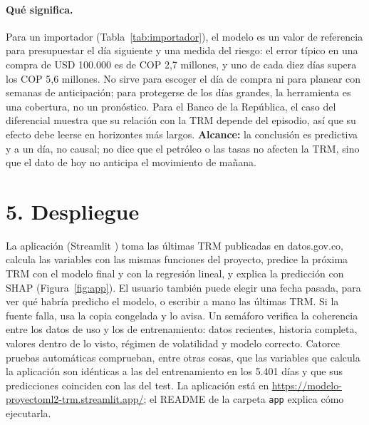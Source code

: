 \documentclass[11pt,letterpaper]{article}
\newcommand{\enlaceapp}{\url{https://modelo-proyectoml2-trm.streamlit.app/}}
\begin{document}
\begin{table}[!htbp]
\centering\footnotesize
\setlength{\tabcolsep}{4pt}
\caption{Error en el test para un importador que compra USD 100.000 (2022--2026).}
\label{tab:importador}

\end{table}

\paragraph{Qué significa.} Para un importador (Tabla~\ref{tab:importador}), el modelo es un valor de referencia para presupuestar el día siguiente y una medida del riesgo: el error típico en una compra de USD 100.000 es de COP 2,7 millones, y uno de cada diez días supera los COP 5,6 millones. No sirve para escoger el día de compra ni para planear con semanas de anticipación; para protegerse de los días grandes, la herramienta es una cobertura, no un pronóstico. Para el Banco de la República, el caso del diferencial muestra que su relación con la TRM depende del episodio, así que su efecto debe leerse en horizontes más largos. \textbf{Alcance:} la conclusión es predictiva y a un día, no causal; no dice que el petróleo o las tasas no afecten la TRM, sino que el dato de hoy no anticipa el movimiento de mañana.

\section*{5. Despliegue}

La aplicación (Streamlit \cite{streamlit}) toma las últimas TRM publicadas en datos.gov.co, calcula las variables con las mismas funciones del proyecto, predice la próxima TRM con el modelo final y con la regresión lineal, y explica la predicción con SHAP (Figura~\ref{fig:app}). El usuario también puede elegir una fecha pasada, para ver qué habría predicho el modelo, o escribir a mano las últimas TRM. Si la fuente falla, usa la copia congelada y lo avisa. Un semáforo verifica la coherencia entre los datos de uso y los de entrenamiento: datos recientes, historia completa, valores dentro de lo visto, régimen de volatilidad y modelo correcto. Catorce pruebas automáticas comprueban, entre otras cosas, que las variables que calcula la aplicación son idénticas a las del entrenamiento en los 5.401 días y que sus predicciones coinciden con las del test. La aplicación está en \enlaceapp; el README de la carpeta \texttt{app} explica cómo ejecutarla.
\end{document}
